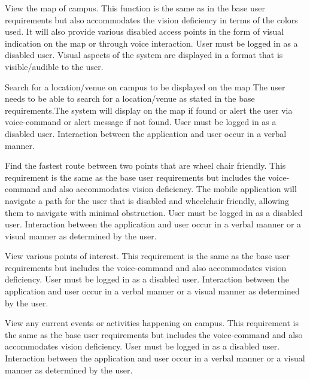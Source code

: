 \FuncReq
{View the map of campus.}
{This function is the same as in the base user requirements but also accommodates the vision deficiency in terms of the colors used. It will also provide various disabled access points in the form of visual indication on the map or through voice interaction.}
{User must be logged in as a disabled user.}
{Visual aspects of the system are displayed in a format that is visible/audible to the user.}

\FuncReq
{Search for a location/venue on campus to be displayed on the map}
{The user needs to be able to search for a location/venue as stated in the base requirements.The system will display on the map if found or alert the user via voice-command or alert message if not found.}
{User must be logged in as a disabled user.}
{Interaction between the application and user occur in a verbal manner.}

\FuncReq
{Find the fastest route between two points that are wheel chair friendly.}%
{This requirement is the same as the base user requirements but includes the voice-command and also accommodates vision deficiency. The mobile application will navigate a path for the user that is disabled and wheelchair friendly, allowing them to navigate with minimal obstruction.}
{User must be logged in as a disabled user.}
{Interaction between the application and user occur in a verbal manner or a visual manner as determined by the user.}

\FuncReq
{View various points of interest.}
{This requirement is the same as the base user requirements but includes the voice-command and also accommodates vision deficiency.}
{User must be logged in as a disabled user.}
{Interaction between the application and user occur in a verbal manner or a visual manner as determined by the user.}

\FuncReq
{View any current events or activities happening on campus.}
{This requirement is the same as the base user requirements but includes the voice-command and also accommodates vision deficiency.}
{User must be logged in as a disabled user.}
{Interaction between the application and user occur in a verbal manner or a visual manner as determined by the user.}

